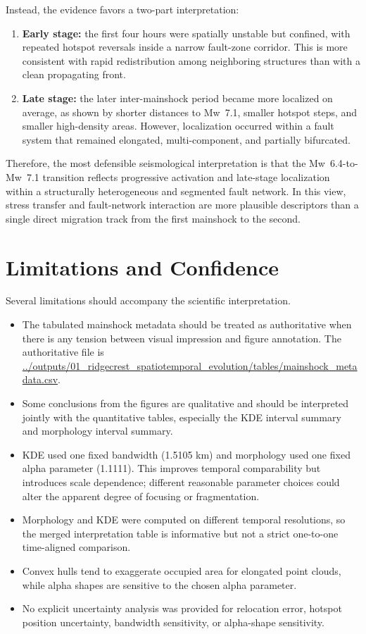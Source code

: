 \documentclass[11pt]{article}
\begin{document}
Instead, the evidence favors a two-part interpretation:
\begin{enumerate}[leftmargin=2em]
    \item \textbf{Early stage:} the first four hours were spatially unstable but confined, with repeated hotspot reversals inside a narrow fault-zone corridor. This is more consistent with rapid redistribution among neighboring structures than with a clean propagating front.
    \item \textbf{Late stage:} the later inter-mainshock period became more localized on average, as shown by shorter distances to Mw~7.1, smaller hotspot steps, and smaller high-density areas. However, localization occurred within a fault system that remained elongated, multi-component, and partially bifurcated.
\end{enumerate}

Therefore, the most defensible seismological interpretation is that the Mw~6.4-to-Mw~7.1 transition reflects progressive activation and late-stage localization within a structurally heterogeneous and segmented fault network. In this view, stress transfer and fault-network interaction are more plausible descriptors than a single direct migration track from the first mainshock to the second.

\section{Limitations and Confidence}
Several limitations should accompany the scientific interpretation.

\begin{itemize}[leftmargin=2em]
    \item The tabulated mainshock metadata should be treated as authoritative when there is any tension between visual impression and figure annotation. The authoritative file is \url{../outputs/01_ridgecrest_spatiotemporal_evolution/tables/mainshock_metadata.csv}.
    \item Some conclusions from the figures are qualitative and should be interpreted jointly with the quantitative tables, especially the KDE interval summary and morphology interval summary.
    \item KDE used one fixed bandwidth (1.5105 km) and morphology used one fixed alpha parameter (1.1111). This improves temporal comparability but introduces scale dependence; different reasonable parameter choices could alter the apparent degree of focusing or fragmentation.
    \item Morphology and KDE were computed on different temporal resolutions, so the merged interpretation table is informative but not a strict one-to-one time-aligned comparison.
    \item Convex hulls tend to exaggerate occupied area for elongated point clouds, while alpha shapes are sensitive to the chosen alpha parameter.
    \item No explicit uncertainty analysis was provided for relocation error, hotspot position uncertainty, bandwidth sensitivity, or alpha-shape sensitivity.
\end{itemize}
\end{document}
